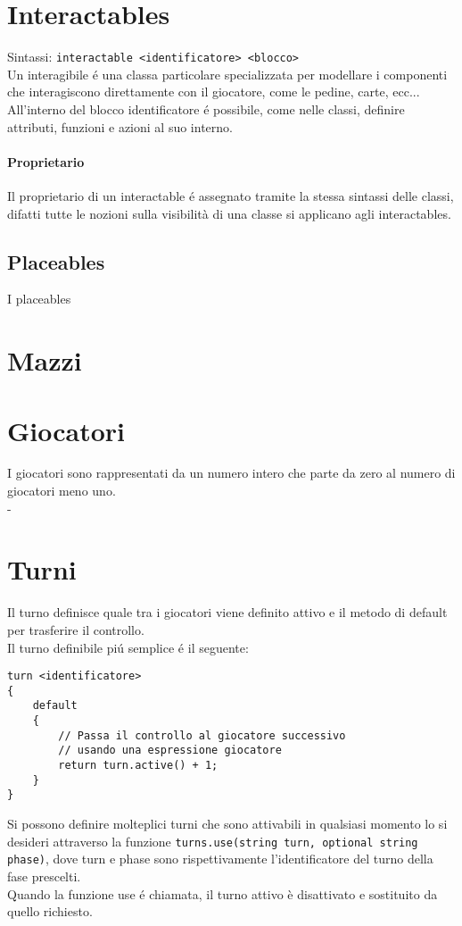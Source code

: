 \section{Interactables}
Sintassi: \lstinline|interactable <identificatore> <blocco>| \\
Un interagibile é una classa particolare specializzata per modellare i componenti che interagiscono
direttamente con il giocatore, come le pedine, carte, ecc... \\
All'interno del blocco identificatore é possibile, come nelle classi, definire attributi,
funzioni e azioni al suo interno. 
\paragraph{Proprietario}
Il proprietario di un interactable é assegnato tramite la stessa sintassi delle classi,
difatti tutte le nozioni sulla visibilità di una classe si applicano agli interactables.

\subsection{Placeables}
I placeables

\section{Mazzi}


\section{Giocatori}
I giocatori sono rappresentati da un numero intero che parte da zero al numero di giocatori meno uno. \\
-

\section{Turni}
Il turno definisce quale tra i giocatori viene definito attivo e il metodo di default
per trasferire il controllo. \\
Il turno definibile piú semplice é il seguente:
\begin{lstlisting}
turn <identificatore>
{
    default
    {
        // Passa il controllo al giocatore successivo 
        // usando una espressione giocatore
        return turn.active() + 1;
    }
}
\end{lstlisting}
Si possono definire molteplici turni che sono attivabili in qualsiasi momento lo si desideri 
attraverso la funzione \lstinline|turns.use(string turn, optional string phase)|, dove
turn e phase sono rispettivamente l'identificatore del turno della fase prescelti. \\
Quando la funzione use é chiamata, il turno attivo è disattivato e sostituito da quello richiesto.

